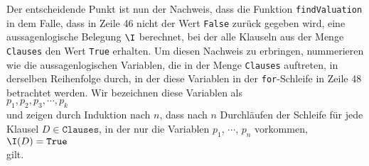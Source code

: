 Der entscheidende Punkt ist nun der Nachweis, dass die Funktion \texttt{findValuation} in dem Falle,
dass in Zeile 46 nicht der Wert \texttt{False} zurück gegeben wird, eine aussagenlogische Belegung $\I$ berechnet, bei der
alle Klauseln aus der Menge \texttt{Clauses} den Wert \texttt{True} erhalten.  Um diesen Nachweis zu
erbringen, nummerieren wie die aussagenlogischen Variablen, die in der Menge \texttt{Clauses}
auftreten, in derselben Reihenfolge durch, in der diese Variablen in der \texttt{for}-Schleife in Zeile
48 betrachtet werden.  Wir bezeichnen diese Variablen als
\\[0.2cm]
\hspace*{1.3cm}
 $p_1, p_2, p_3, \cdots, p_k$
\\[0.2cm]
und zeigen durch Induktion nach $n$, dass nach $n$ Durchläufen der Schleife für jede Klausel $D \in \texttt{Clauses}$, 
in der nur die Variablen $p_1$, $\cdots$, $p_n$ vorkommen, 
\\[0.2cm]
\hspace*{1.3cm}
$\I(D) = \texttt{True}$
\\[0.2cm]
gilt.
